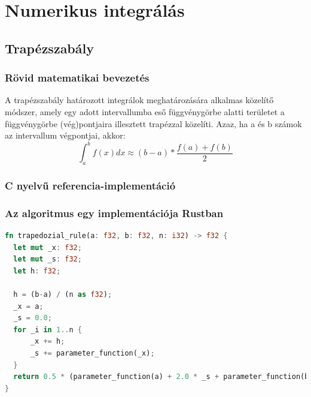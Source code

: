 

\section{Numerikus integrálás}

\subsection{Trapézszabály}
\subsubsection{Rövid matematikai bevezetés}
A trapézszabály határozott integrálok meghatározására alkalmas közelítő módszer, amely egy adott intervallumba eső függvénygörbe alatti területet a függvénygörbe (vég)pontjaira illesztett trapézzal közelíti. Azaz, ha a és b számok az intervallum végpontjai, akkor:
\[ \int_{a}^{b} f(x) dx \approx (b-a) * \frac{f(a) + f(b)}{2} \]
\subsubsection{C nyelvű referencia-implementáció}
\subsubsection{Az algoritmus egy implementációja Rustban}
\begin{lstlisting}[language=Rust, style=boxed]
fn trapedozial_rule(a: f32, b: f32, n: i32) -> f32 {
  let mut _x: f32;
  let mut _s: f32;
  let h: f32;
  
  h = (b-a) / (n as f32);
  _x = a;
  _s = 0.0;
  for _i in 1..n {
	  _x += h;
	  _s += parameter_function(_x);
  }
  return 0.5 * (parameter_function(a) + 2.0 * _s + parameter_function(b) );
}
\end{lstlisting}

